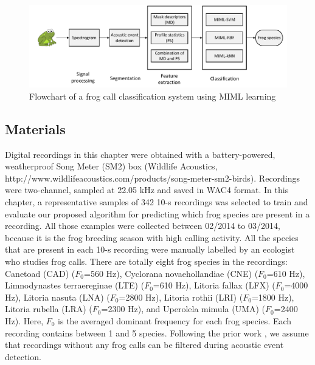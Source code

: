 \begin{figure}[htb!]
\centering
\includegraphics[width=\textwidth]{image/Ch6/flowchart.pdf}
\caption{Flowchart of a frog call classification system using MIML learning}
\label{fig:flowchart}
\end{figure}



\subsection{Materials}
\label{chap5:Materials}
Digital recordings in this chapter were obtained with a battery-powered, weatherproof Song
Meter (SM2) box (Wildlife Acoustics, http://www.wildlifeacoustics.com/products/song-meter-sm2-birds). Recordings were two-channel, sampled at 22.05 kHz and saved in WAC4 format. In this chapter, a representative samples of 342 10-s recordings was selected to train and evaluate our proposed algorithm for predicting which frog species are present in a recording. All those examples were collected between 02/2014 to 03/2014, because it is the frog breeding season with high calling activity. All the species that are present in each 10-s recording were manually labelled by an ecologist who studies frog calls.
There are totally eight frog species in the recordings: Canetoad (CAD) 
($F_{0}$=560 Hz), Cyclorana novaehollandiae (CNE) ($F_{0}$=610 Hz), Limnodynastes terraereginae (LTE) ($F_{0}$=610 Hz), Litoria fallax (LFX) ($F_{0}$=4000 Hz), Litoria nasuta (LNA) ($F_{0}$=2800 Hz), Litoria rothii (LRI) ($F_{0}$=1800 Hz), Litoria rubella (LRA) ($F_{0}$=2300 Hz), and Uperolela mimula (UMA) ($F_{0}$=2400 Hz). Here, $F_{0}$ is the averaged dominant frequency for each frog species. Each recording contains between 1 and 5 species. Following the prior work \cite{briggs2012acoustic}, we assume that recordings without any frog calls can be filtered during acoustic event detection.


